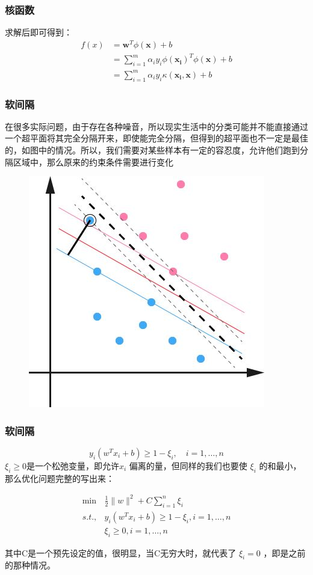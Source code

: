 \begin{frame}

\frametitle{核函数}

求解后即可得到：
\begin{align*}
f(x)&=\boldsymbol{w}^T\phi(\boldsymbol{x})+b\\
&=\sum_{i=1}^m\alpha_i y_i \phi(\boldsymbol{x_i})^T\phi(\boldsymbol{x})+b\\
&= \sum_{i=1}^m\alpha_i y_i \kappa(\boldsymbol{x_i, x}) + b
\end{align*}
\end{frame}



\begin{frame}

\frametitle{软间隔}
 在很多实际问题，由于存在各种噪音，所以现实生活中的分类可能并不能直接通过一个超平面将其完全分隔开来，即使能完全分隔，但得到的超平面也不一定是最佳的，如图中的情况。所以，我们需要对某些样本有一定的容忍度，允许他们跑到分隔区域中，那么原来的约束条件需要进行变化
 \begin{figure}[ht]
	\centering
	\includegraphics[width=0.5\linewidth]{partition/img/svm_12.jpg}  
	\end{figure}
 
\end{frame}


\begin{frame}

\frametitle{软间隔}
\[
y_i(w^Tx_i+b)\geq 1-\xi_i, \quad i=1,\ldots,n
\]
$\xi_i\geq 0$是一个松弛变量，即允许$ x_i$ 偏离的量，但同样的我们也要使 $\xi_i$ 的和最小，那么优化问题完整的写出来：

\begin{align*}
\min & \frac{1}{2}\|w\|^2 + C\sum_{i=1}^n\xi_i \\
 s.t., & y_i(w^Tx_i+b)\geq 1-\xi_i, i=1,\ldots,n \\
& \xi_i \geq 0, i=1,\ldots,n 
\end{align*}

其中C是一个预先设定的值，很明显，当C无穷大时，就代表了 $\xi_i=0$ ，即是之前的那种情况。

\end{frame}



